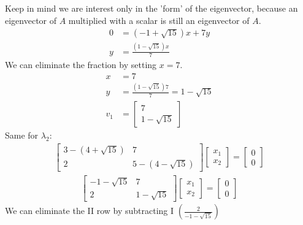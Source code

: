 \begin{example}
    Keep in mind we are interest only in the 'form' of the eigenvector, because an eigenvector of $A$ multiplied with a scalar is still an eigenvector of $A$.
    \begin{align*}
        0 & = (-1 + \sqrt{15})x + 7y     \\
        y & = \frac{(1 - \sqrt{15})x}{7}
    \end{align*}
    We can eliminate the fraction by setting  $x=7$.
    \begin{align*}
        x   & = 7                                          \\
        y   & = \frac{(1 - \sqrt{15})7}{7} = 1 - \sqrt{15} \\
        v_1 & = \begin{bmatrix}
            7 \\ 1 - \sqrt{15}
        \end{bmatrix}
    \end{align*}
    Same for $\lambda_2$:
    \begin{align*}
        \begin{bmatrix}
            3 - (4 + \sqrt{15}) & 7                   \\
            2                   & 5 - (4 - \sqrt{15})
        \end{bmatrix} \begin{bmatrix}
            x_1 \\ x_2
        \end{bmatrix} = \begin{bmatrix}
            0 \\ 0
        \end{bmatrix}
    \end{align*}
    \begin{align*}
        \begin{bmatrix}
            -1 - \sqrt{15} & 7             \\
            2              & 1 - \sqrt{15}
        \end{bmatrix} \begin{bmatrix}
            x_1 \\ x_2
        \end{bmatrix} = \begin{bmatrix}
            0 \\ 0
        \end{bmatrix}
    \end{align*}
    We can eliminate the II row by subtracting I $ \left( \frac{2}{-1 - \sqrt{15}} \right) $ \\

\end{example}
